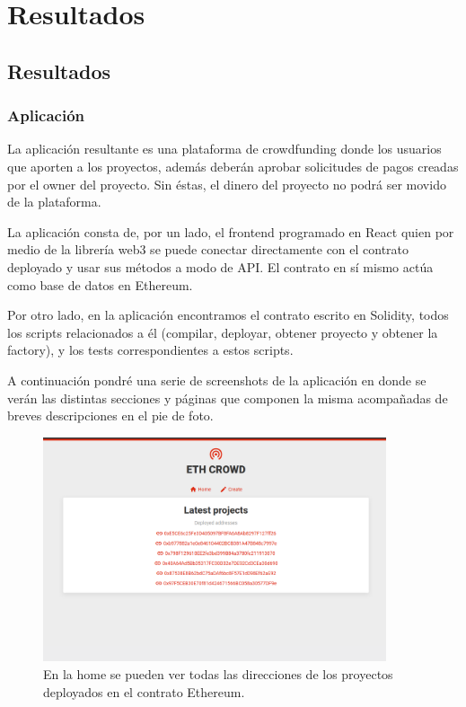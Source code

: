 
\chapter{Resultados}

\ifpdf
    \graphicspath{{Chapter4/Figs/}{Chapter4/Figs/PDF/}{Chapter4/Figs/}}
\else
    \graphicspath{{Chapter4/Figs/}{Chapter4/Figs/}}
\fi


\section{Resultados}

\subsection{Aplicación}
La aplicación resultante es una plataforma de crowdfunding donde los usuarios que aporten 
a los proyectos, además deberán aprobar solicitudes de pagos creadas por el owner del proyecto.
Sin éstas, el dinero del proyecto no podrá ser movido de la plataforma.

La aplicación consta de, por un lado, el frontend programado en React quien por medio de la 
librería web3 se puede conectar directamente con el contrato deployado y usar sus métodos a modo
de API. El contrato en sí mismo actúa como base de datos en Ethereum.

Por otro lado, en la aplicación encontramos el contrato escrito en Solidity, todos los scripts
relacionados a él (compilar, deployar, obtener proyecto y obtener la factory), y los tests
correspondientes a estos scripts.

A continuación pondré una serie de screenshots de la aplicación en donde se verán las distintas
secciones y páginas que componen la misma acompañadas de breves descripciones en el pie de foto.

\begin{figure}[H] 
\centering    
\includegraphics[width=0.9\textwidth]{home}
\caption[home]{En la home se pueden ver todas las direcciones de los proyectos deployados en el contrato Ethereum.}
\label{fig:home}
\end{figure}

